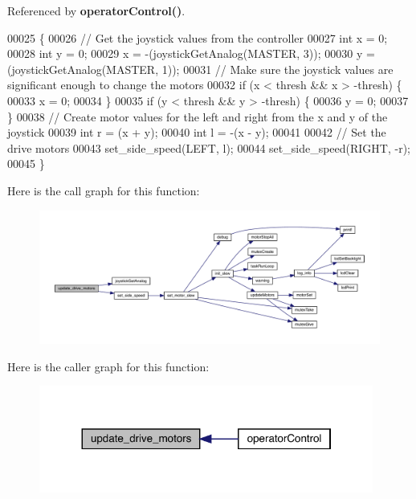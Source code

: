 Referenced by \textbf{ operator\+Control()}.


\begin{DoxyCode}
00025                            \{
00026   \textcolor{comment}{// Get the joystick values from the controller}
00027   \textcolor{keywordtype}{int} x = 0;
00028   \textcolor{keywordtype}{int} y = 0;
00029   x = -(joystickGetAnalog(MASTER, 3));
00030   y = (joystickGetAnalog(MASTER, 1));
00031   \textcolor{comment}{// Make sure the joystick values are significant enough to change the motors}
00032   \textcolor{keywordflow}{if} (x < thresh && x > -thresh) \{
00033     x = 0;
00034   \}
00035   \textcolor{keywordflow}{if} (y < thresh && y > -thresh) \{
00036     y = 0;
00037   \}
00038   \textcolor{comment}{// Create motor values for the left and right from the x and y of the joystick}
00039   \textcolor{keywordtype}{int} r = (x + y);
00040   \textcolor{keywordtype}{int} l = -(x - y);
00041 
00042   \textcolor{comment}{// Set the drive motors}
00043   set_side_speed(LEFT, l);
00044   set_side_speed(RIGHT, -r);
00045 \}
\end{DoxyCode}
Here is the call graph for this function\+:
\nopagebreak
\begin{figure}[H]
\begin{center}
\leavevmode
\includegraphics[width=350pt]{drive_8c_a8224a4626a934d30ed587671b7004bf8_cgraph}
\end{center}
\end{figure}
Here is the caller graph for this function\+:
\nopagebreak
\begin{figure}[H]
\begin{center}
\leavevmode
\includegraphics[width=311pt]{drive_8c_a8224a4626a934d30ed587671b7004bf8_icgraph}
\end{center}
\end{figure}


